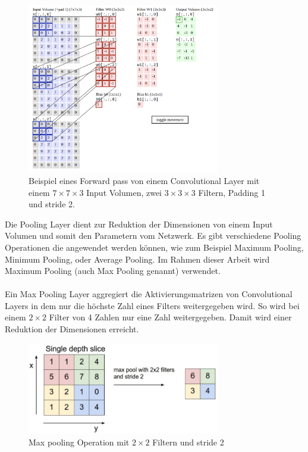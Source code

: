 \begin{figure}[H]
  \centering
  \includegraphics[width=0.75\textwidth]{resources/cnn/funktion-cnn.png}
  \caption{
    Beispiel eines Forward pass von einem Convolutional \gls{Layer} mit einem $ 7\times7\times3 $ Input Volumen, zwei $3\times3\times3$ Filtern, 
    Padding 1 und \gls{stride} 2.
    \cite{convnet-demo}
  }
  \label{image:convnet-demo}
\end{figure}

Die Pooling Layer dient zur Reduktion der Dimensionen von einem Input Volumen und somit den Parametern vom Netzwerk. Es gibt 
verschiedene Pooling Operationen die angewendet werden können, wie zum Beispiel Maximum Pooling, Minimum Pooling, oder Average Pooling. Im Rahmen 
dieser Arbeit wird Maximum Pooling (auch Max Pooling genannt) verwendet.
\\
\\
Ein Max Pooling \gls{Layer} aggregiert die Aktivierungsmatrizen von Convolutional Layers in dem nur die höchste Zahl eines Filters weitergegeben 
wird. So wird bei einem $ 2 \times 2 $ Filter von 4 Zahlen nur eine Zahl weitergegeben. Damit wird einer Reduktion der Dimensionen erreicht.

\begin{figure}[H]
  \centering
  \includegraphics[width=0.75\textwidth]{resources/cnn/pooling.png}
  \caption{
    Max pooling Operation mit $ 2 \times 2 $ Filtern und \gls{stride} 2
    \cite{convnet-demo}
  }
  \label{image:pooling}
\end{figure}

